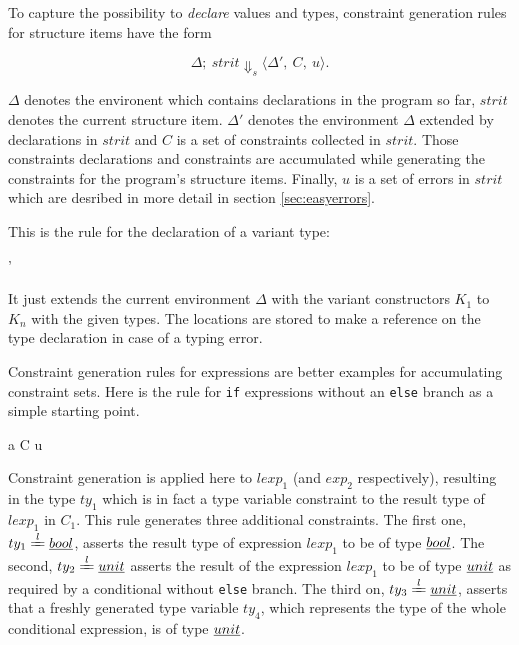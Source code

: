 To capture the possibility to \emph{declare} values and types, constraint
generation rules for structure items have the form

\[ \Delta;\ strit \Downarrow_s \langle \Delta',\ C,\ u\rangle.\]

$\Delta$ denotes the environent which contains declarations in the program so
far, $strit$ denotes the current structure item.
$\Delta'$ denotes the environment $\Delta$ extended by declarations in $strit$
and $C$ is a set of constraints collected in $strit$.
Those constraints declarations and constraints are accumulated while generating
the constraints for the program's structure items.
Finally, $u$ is a set of errors in $strit$ which are desribed in more detail
in section \ref{sec:easyerrors}.

This is the rule for the declaration of a variant type:

\begin{center}
{
{\styjudge {} {\Delta'} \emptyset \emptyset}}
\end{center}

It just extends the current environment $\Delta$ with the variant constructors
$K_1$ to $K_n$ with the given types.
The locations are stored to make a reference on the type declaration in case of
a typing error.

Constraint generation rules for expressions are better examples for
accumulating constraint sets.
Here is the rule for \texttt{if} expressions without an \texttt{else} branch as
a simple starting point.

\begin{center}
{\etyjudge {} a C u}
\end{center}

Constraint generation is applied here to $lexp_1$ (and $exp_2$ respectively),
resulting  in the type $ty_1$ which is in fact a type variable constraint to
the result type of $lexp_1$ in $C_1$.
This rule generates three additional constraints.
The first one, $ty_1 \xlongequal l \type{bool}$, asserts the result type of
expression $lexp_1$ to be of type $\underline{bool}$.
The second, $ty_2 \xlongequal l \type{unit}$ asserts the result of the
expression $lexp_1$ to be of type $\underline{unit}$ as required by a conditional
without \texttt{else} branch.
The third on, $ty_3 \xlongequal l \type{unit}$, asserts that a freshly
generated type variable $ty_4$, which represents the type of the whole
conditional expression, is of type $\underline{unit}$.

